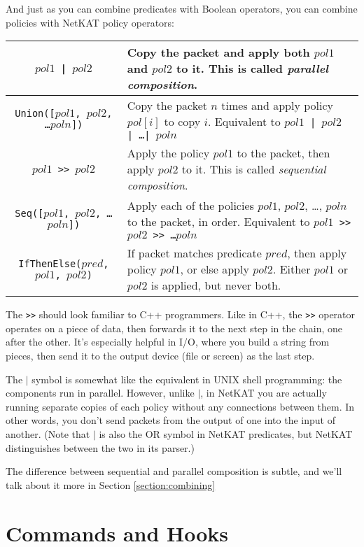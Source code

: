 And just as you can combine predicates with Boolean operators, you can combine policies with NetKAT 
policy operators:

\bigskip
\begin{tabularx}{\linewidth}{|c|X|}
\hline\hline
\texttt{$pol1$ | $pol2$} & Copy the packet and apply both $pol1$ and $pol2$ to it.   
This is called \textit{parallel composition}.
\\ \hline  
\texttt{Union([$pol1$, $pol2$, \ldots $poln$])} & 
Copy the packet $n$ times and apply policy $pol[i]$ to copy $i$.
Equivalent to \texttt{$pol1$ | $pol2$ | \ldots | $poln$}
\\ \hline  
\texttt{$pol1$ >> $pol2$} & Apply the policy $pol1$ to the packet, then apply $pol2$ to it.
This is called \textit{sequential composition}.
\\ \hline  
\texttt{Seq([$pol1$, $pol2$, \ldots $poln$])} & 
Apply each of the policies $pol1$, $pol2$, \ldots, $poln$ to the packet, in order. 
Equivalent to \texttt{$pol1$ >> $pol2$ >> \ldots $poln$}
\\ \hline  
\texttt{IfThenElse($pred$, $pol1$, $pol2$)} & If packet matches predicate $pred$, then apply policy $pol1$, or else
apply $pol2$.  
Either $pol1$ or $pol2$ is applied, but never both.
\\ \hline\hline
\end{tabularx}

\bigskip

The \texttt{>>} should look familiar to C++ programmers. 
Like in C++, the \texttt{>>} operator operates on a piece of data, then forwards it to the next step in the chain, one
after the other.
It's especially helpful in I/O, where you build a string from pieces, 
then send it to the output device (file or screen) as the
last step.

The $\vert$ symbol is somewhat like the equivalent in UNIX shell programming: the components run in parallel.
However, unlike $\vert$, in NetKAT you are actually running separate copies of each policy without any connections
between them.
In other words, you don't send packets from the output of one into the input of another.
(Note that $\vert$ is also the OR symbol in NetKAT predicates, but NetKAT distinguishes between the two in
its parser.)

The difference between sequential and parallel composition is subtle, and we'll talk about it more in
Section \ref{section:combining}

\section{Commands and Hooks}

